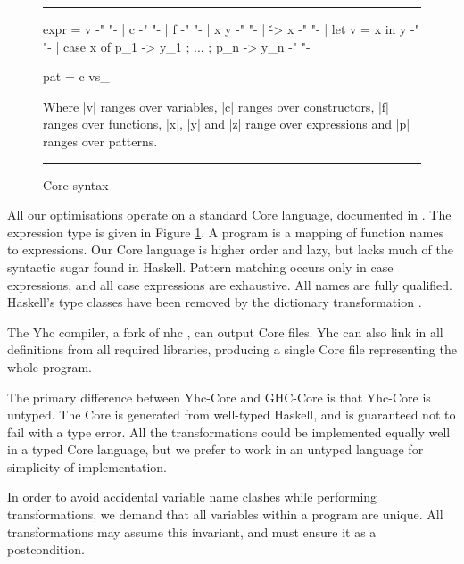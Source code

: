 \documentclass{llncs}
\newenvironment{fig}
    {\begin{figure}[tbp]\hrule}
    {\end{figure}}
\newcommand{\figend}{\hrule}
\begin{document}
\begin{fig}
\begin{code}
expr  =  v                                          {-"  "-}
      |  c                                          {-"  "-}
      |  f                                          {-"  "-}
      |  x y                                        {-"  "-}
      |  \v -> x                                    {-"  "-}
      |  let v = x in y                             {-"  "-}
      |  case x of {p_1 -> y_1 ; ... ; p_n -> y_n}  {-"  "-}

pat   =  c vs_
\end{code}

Where |v| ranges over variables, |c| ranges over constructors, |f| ranges over functions, |x|, |y| and |z| range over expressions and |p| ranges over patterns.
\bigskip
\figend
\caption{Core syntax}
\label{fig:core}
\end{fig}

All our optimisations operate on a standard Core language, documented in \cite{me:yhc_core}. The expression type is given in Figure \ref{fig:core}. A program is a mapping of function names to expressions. Our Core language is higher order and lazy, but lacks much of the syntactic sugar found in Haskell. Pattern matching occurs only in case expressions, and all case expressions are exhaustive. All names are fully qualified. Haskell's type classes have been removed by the dictionary transformation \cite{wadler:type_classes}.

The Yhc compiler, a fork of nhc \cite{nhc}, can output Core files. Yhc can also link in all definitions from all required libraries, producing a single Core file representing the whole program.

The primary difference between Yhc-Core and GHC-Core \cite{ghc_core} is that Yhc-Core is untyped. The Core is generated from well-typed Haskell, and is guaranteed not to fail with a type error. All the transformations could be implemented equally well in a typed Core language, but we prefer to work in an untyped language for simplicity of implementation.

In order to avoid accidental variable name clashes while performing transformations, we demand that all variables within a program are unique. All transformations may assume this invariant, and must ensure it as a postcondition.
\end{document}
